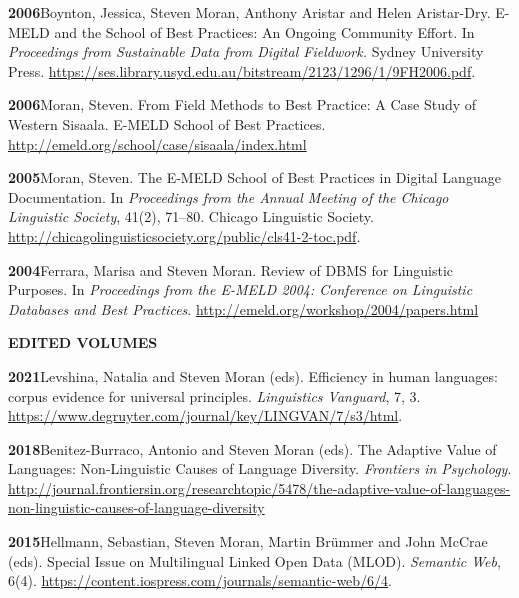 \documentclass[11pt]{article}
\newcommand{\hangpara}{
 \setlength{\parindent}{0in} %
 \hangindent=0.42in %
}
\begin{document}
\vskip 6pt
\hangpara
{\bf 2006}\hspace{1ex}Boynton, Jessica, Steven Moran, Anthony Aristar and Helen Aristar-Dry. E-MELD and the School of Best Practices: An Ongoing Community Effort. In {\it Proceedings from Sustainable Data from Digital Fieldwork.} Sydney University Press. \url{https://ses.library.usyd.edu.au/bitstream/2123/1296/1/9FH2006.pdf}. %

\vskip 6pt
\hangpara
{\bf 2006}\hspace{1ex}Moran, Steven. From Field Methods to Best Practice: A Case Study of Western Sisaala. E-MELD School of Best Practices. \url{http://emeld.org/school/case/sisaala/index.html}

\vskip 6pt
\hangpara
{\bf 2005}\hspace{1ex}Moran, Steven. The E-MELD School of Best Practices in Digital Language Documentation. In {\it Proceedings from the Annual Meeting of the Chicago Linguistic Society}, 41(2), 71--80. Chicago Linguistic Society. \url{http://chicagolinguisticsociety.org/public/cls41-2-toc.pdf}.


\vskip 6pt
\hangpara
{\bf 2004}\hspace{1ex}Ferrara, Marisa and Steven Moran. Review of DBMS for Linguistic Purposes. In {\it Proceedings from the E-MELD 2004: Conference on Linguistic Databases and Best Practices}. \url{http://emeld.org/workshop/2004/papers.html}

\clearpage

\vskip 20pt
\begin{flushleft}
{\bf EDITED VOLUMES}
\end{flushleft}

\hangpara
{\bf 2021}\hspace{1ex}Levshina, Natalia and Steven Moran (eds). Efficiency in human languages: corpus evidence for universal principles. {\it Linguistics Vanguard}, 7, 3. \url{https://www.degruyter.com/journal/key/LINGVAN/7/s3/html}.

\hangpara
\vskip 6pt
{\bf 2018}\hspace{1ex}Benitez-Burraco, Antonio and Steven Moran (eds). The Adaptive Value of Languages: Non-Linguistic Causes of Language Diversity. {\it Frontiers in Psychology}. \url{http://journal.frontiersin.org/researchtopic/5478/the-adaptive-value-of-languages-non-linguistic-causes-of-language-diversity}

\hangpara
\vskip 6pt
{\bf 2015}\hspace{1ex}Hellmann, Sebastian, Steven Moran, Martin Brümmer and John McCrae (eds). Special Issue on Multilingual Linked Open Data (MLOD). \textit{Semantic Web}, 6(4). \url{https://content.iospress.com/journals/semantic-web/6/4}.
\end{document}
